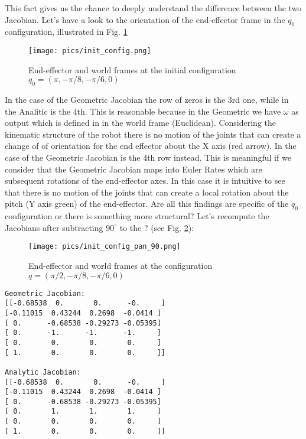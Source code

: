 \documentclass[11pt]{article}
\begin{document}
This fact gives us the chance to deeply understand the difference between the two Jacobian. Let's have a look to the orientation of the end-effector frame 
in the $q_0$ configuration, illustrated in Fig. \ref{fig:init_conf}

\begin{figure}[bht]
	\centering
	\texttt{[image: pics/init\_config.png]}
	\caption{End-effector and world frames at the initial configuration $q_0 = ( \pi, -\pi/8, -\pi/6, 0 ) $   }
	\label{fig:init_conf}
\end{figure}


In the case of the Geometric Jacobian the row of zeros is the 3rd one, while in the Analitic is the 4th. 
This is reasonable because in the Geometric we have $\omega$ as output which is defined in in the world frame (Euclidean). 
Considering the kinematic structure of the robot there is no motion of the joints that can create a change of of orientation for the end effector 
about the X axis (red arrow). In the case of the Geometric Jacobian is the 4th row instead. This is meaningful if we consider that the Geometric Jacobian maps into Euler Rates which are subsequent rotations of the end-effector axes. In this case  it is intuitive to see that there is no motion of the joints that can create a local rotation about the pitch (Y axis green) of the end-effector.
Are all this findings are specific of the $q_0$ configuration or there is something more structural? Let's recompute the Jacobians after subtracting $90^\circ$ to the ? (see Fig. \ref{fig:init_conf90}):

\begin{figure}[bht]
	\centering
	\texttt{[image: pics/init\_config\_pan\_90.png]}
	\caption{End-effector and world frames at the configuration $q = ( \pi/2, -\pi/8, -\pi/6, 0 )  $ }
	\label{fig:init_conf90}
\end{figure}

\begin{verbatim}
Geometric Jacobian:
[[-0.68538  0.       0.      -0.     ]
[-0.11015  0.43244  0.2698  -0.0414 ]
[ 0.      -0.68538 -0.29273 -0.05395]
[ 0.      -1.      -1.      -1.     ]
[ 0.       0.       0.       0.     ]
[ 1.       0.       0.       0.     ]]

Analytic Jacobian:
[[-0.68538  0.       0.      -0.     ]
[-0.11015  0.43244  0.2698  -0.0414 ]
[ 0.      -0.68538 -0.29273 -0.05395]
[ 0.       1.       1.       1.     ]
[ 0.       0.       0.       0.     ]
[ 1.       0.       0.       0.     ]]
\end{verbatim}
\end{document}
